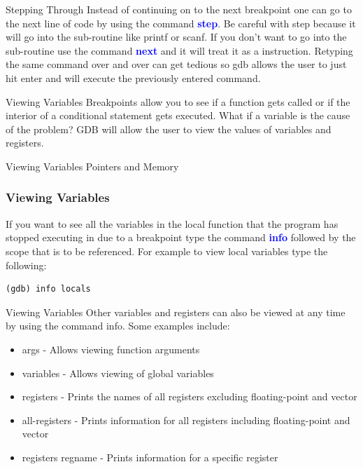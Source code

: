 \documentclass[11pt]{beamer}
\begin{document}
\begin{frame}{Stepping Through}
Instead of continuing on to the next breakpoint one can go to the next line of code by using the command \textbf{\textcolor{blue}{step}}. 
\break
\break
Be careful with step because it will go into the sub-routine like printf or scanf. If you don't want to go into the sub-routine use the command \textbf{\textcolor{blue}{next}} and it will treat it as a instruction.
\break
\break
Retyping the same command over and over can get tedious so gdb allows the user to just hit enter and will execute the previously entered command.
\end{frame}

\begin{frame}{Viewing Variables}
Breakpoints allow you to see if a function gets called or if the interior of a conditional statement gets executed.
\break
\break
What if a variable is the cause of the problem? 
\break
\break
GDB will allow the user to view the values of variables and registers.
\end{frame}

\begin{frame}{Viewing Variables}
Pointers and Memory

\end{frame}

\begin{frame}[fragile]
\frametitle{Viewing Variables}
If you want to see all the variables in the local function that the program has stopped executing in due to a breakpoint type the command \textbf{\textcolor{blue}{info}} followed by the scope that is to be referenced. 
\break
\break
For example to view local variables type the following:
\begin{lstlisting}[style=BashInputStyle]
(gdb) info locals
\end{lstlisting}
\end{frame}

\begin{frame}{Viewing Variables}
Other variables and registers can also be viewed at any time by using the command info. Some examples include:
\begin{itemize}
\item args - Allows viewing function arguments
\item variables - Allows viewing of global variables
\item registers - Prints the names of all registers excluding floating-point and vector
\item all-registers - Prints information for all registers including floating-point and vector
\item registers regname - Prints information for a specific register
\end{itemize}
\end{frame}
\end{document}
